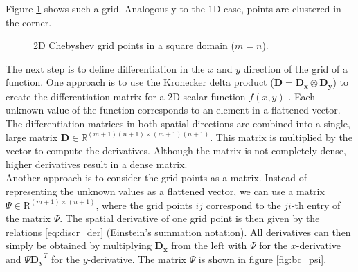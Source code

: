 Figure \ref{fig:cheb_grid2d} shows such a grid. Analogously to the
1D case, points are clustered in the corner. \\

\begin{figure}[ht]
  \centering
  \caption{2D Chebyshev grid points in a square domain ($m = n$).}
  \label{fig:cheb_grid2d}
\end{figure}

The next step is to define differentiation in the $x$ and $y$ direction of the
grid of a function. One approach is to use the Kronecker delta product
($\mathbf{D} = \mathbf{D_x} \otimes \mathbf{D_y}$) to create the differentiation
matrix for a 2D scalar function $f(x,y)$ \citep{trefethen2000}. Each unknown
value of the function corresponds to an element in a flattened vector. The
differentiation matrices in both spatial directions are combined into a single,
large matrix $\mathbf{D} \in \mathbb{R}^{(m+1)(n+1)\times(m+1)(n+1)}$. This
matrix is multiplied by the vector to compute the derivatives. Although the
matrix is not completely dense, higher derivatives result in a dense matrix. \\

Another approach is to consider the grid points as a matrix. Instead of
representing the unknown values as a flattened vector, we can use a matrix
$\Psi \in \mathrm{R}^{(m+1) \times (n+1)}$, where the grid points $ij$
correspond to the $ji$-th entry of the matrix $\Psi$. The spatial derivative of
one grid point is then given by the relations \eqref{eq:discr_der} (Einstein's
summation notation). All derivatives can then simply be obtained by multiplying
$\mathbf{D_x}$ from the left with $\Psi$ for the $x$-derivative and $\Psi
\mathbf{D_y}^T$ for the $y$-derivative. The matrix $\Psi$ is shown in figure
\ref{fig:bc_psi}.

